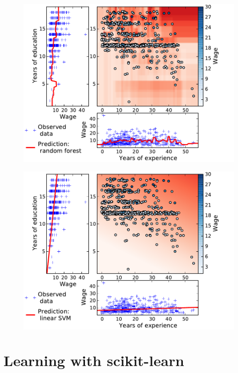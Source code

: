 \documentclass[a4paper]{article}
\begin{document}
\begin{figure}
    \hspace*{-.015\linewidth}%
    \includegraphics[width=1.05\linewidth]{wage_data_random_forest}%
\end{figure}

\begin{figure}
    \hspace*{-.015\linewidth}%
    \includegraphics[width=1.05\linewidth]{wage_data_linear_svm}%
\end{figure}

\section{Learning with scikit-learn}
\end{document}
